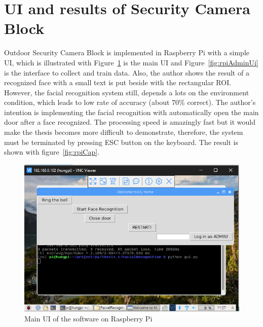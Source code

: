 \section{UI and results of Security Camera Block}
Outdoor Security Camera Block is implemented in Raspberry Pi with a simple UI, which is illustrated with Figure~\ref{fig:rpiUi} is the main UI and Figure~\ref{fig:rpiAdminUi} is the interface to collect and train data. Also, the author shows the result of a recognized face with a small text is put beside with the rectangular ROI. However, the facial recognition system still, depends a lots on the environment condition, which leads to low rate of accuracy (about 70\% correct). The author’s intention is implementing the facial recognition with automatically open the main door after a face recognized. The processing speed is amazingly fast but it would make the thesis becomes more difficult to demonstrate, therefore, the system must be terminated by pressing ESC button on the keyboard. The result is shown with figure~\ref{fig:rpiCap}.
\begin{figure}[!htb]
    \begin{center}
    \includegraphics[scale=0.85]{images/rpiUi.png}
    \caption{Main UI of the software on Raspberry Pi}
    \label{fig:rpiUi}
    \end{center}
\end{figure}
